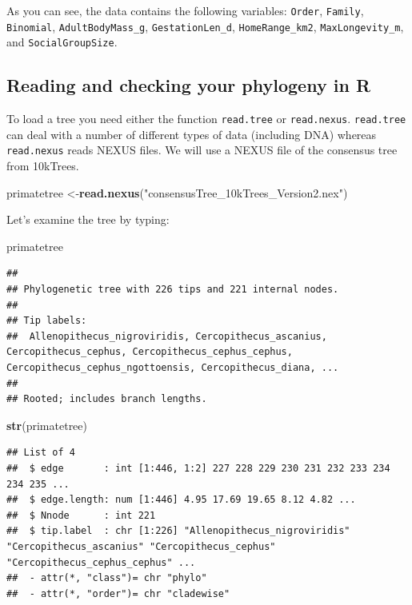 \documentclass[]{book}
\newenvironment{Shaded}{\begin{snugshade}}{\end{snugshade}}
\newcommand{\KeywordTok}[1]{\textcolor[rgb]{0.13,0.29,0.53}{\textbf{{#1}}}}
\newcommand{\StringTok}[1]{\textcolor[rgb]{0.31,0.60,0.02}{{#1}}}
\newcommand{\NormalTok}[1]{{#1}}
\begin{document}
As you can see, the data contains the following variables:
\texttt{Order}, \texttt{Family}, \texttt{Binomial},
\texttt{AdultBodyMass\_g}, \texttt{GestationLen\_d},
\texttt{HomeRange\_km2}, \texttt{MaxLongevity\_m}, and
\texttt{SocialGroupSize}.

\subsection{Reading and checking your phylogeny in
R}\label{reading-and-checking-your-phylogeny-in-r}

To load a tree you need either the function \texttt{read.tree} or
\texttt{read.nexus}. \texttt{read.tree} can deal with a number of
different types of data (including DNA) whereas \texttt{read.nexus}
reads NEXUS files. We will use a NEXUS file of the consensus tree from
10kTrees.

\begin{Shaded}
\begin{Highlighting}[]
\NormalTok{primatetree <-}\KeywordTok{read.nexus}\NormalTok{(}\StringTok{"consensusTree_10kTrees_Version2.nex"}\NormalTok{)}
\end{Highlighting}
\end{Shaded}

Let's examine the tree by typing:

\begin{Shaded}
\begin{Highlighting}[]
\NormalTok{primatetree}
\end{Highlighting}
\end{Shaded}

\begin{verbatim}
## 
## Phylogenetic tree with 226 tips and 221 internal nodes.
## 
## Tip labels:
##  Allenopithecus_nigroviridis, Cercopithecus_ascanius, Cercopithecus_cephus, Cercopithecus_cephus_cephus, Cercopithecus_cephus_ngottoensis, Cercopithecus_diana, ...
## 
## Rooted; includes branch lengths.
\end{verbatim}

\begin{Shaded}
\begin{Highlighting}[]
\KeywordTok{str}\NormalTok{(primatetree)}
\end{Highlighting}
\end{Shaded}

\begin{verbatim}
## List of 4
##  $ edge       : int [1:446, 1:2] 227 228 229 230 231 232 233 234 234 235 ...
##  $ edge.length: num [1:446] 4.95 17.69 19.65 8.12 4.82 ...
##  $ Nnode      : int 221
##  $ tip.label  : chr [1:226] "Allenopithecus_nigroviridis" "Cercopithecus_ascanius" "Cercopithecus_cephus" "Cercopithecus_cephus_cephus" ...
##  - attr(*, "class")= chr "phylo"
##  - attr(*, "order")= chr "cladewise"
\end{verbatim}
\end{document}
